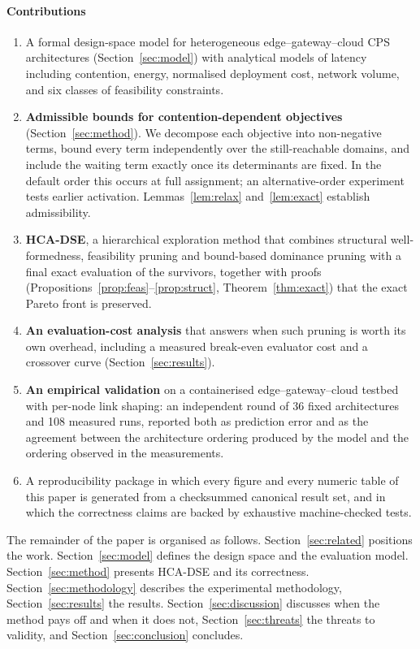 \documentclass[preprint,11pt,3p]{elsarticle}
\theoremstyle{plain}
\theoremstyle{definition}
\begin{document}
\paragraph{Contributions}
\begin{enumerate}
\item A formal design-space model for heterogeneous edge--gateway--cloud CPS
  architectures (Section~\ref{sec:model}) with analytical models of latency including
  contention, energy, normalised deployment cost, network volume, and six classes of
  feasibility constraints.
\item \textbf{Admissible bounds for contention-dependent objectives}
  (Section~\ref{sec:method}). We decompose each objective into non-negative terms,
  bound every term independently over the still-reachable domains, and include the waiting term exactly once its determinants are fixed.
  In the default order this occurs at full assignment; an alternative-order experiment tests earlier activation. Lemmas~\ref{lem:relax} and~\ref{lem:exact} establish
  admissibility.
\item \textbf{HCA-DSE}, a hierarchical exploration method that combines structural
  well-formedness, feasibility pruning and bound-based dominance pruning with a final
  exact evaluation of the survivors, together with proofs
  (Propositions~\ref{prop:feas}--\ref{prop:struct}, Theorem~\ref{thm:exact}) that the
  exact Pareto front is preserved.
\item \textbf{An evaluation-cost analysis} that answers when such pruning is worth its
  own overhead, including a measured break-even evaluator cost and a crossover curve
  (Section~\ref{sec:results}).
\item \textbf{An empirical validation} on a containerised edge--gateway--cloud testbed
  with per-node link shaping: an independent round of 36 fixed architectures and 108 measured runs, reported both as
  prediction error and as the agreement between the architecture ordering produced by
  the model and the ordering observed in the measurements.
\item A reproducibility package in which every figure and every numeric table of this
  paper is generated from a checksummed canonical result set, and in which the
  correctness claims are backed by exhaustive machine-checked tests.
\end{enumerate}

The remainder of the paper is organised as follows. Section~\ref{sec:related} positions
the work. Section~\ref{sec:model} defines the design space and the evaluation model.
Section~\ref{sec:method} presents HCA-DSE and its correctness.
Section~\ref{sec:methodology} describes the experimental methodology,
Section~\ref{sec:results} the results. Section~\ref{sec:discussion} discusses when the
method pays off and when it does not, Section~\ref{sec:threats} the threats to validity,
and Section~\ref{sec:conclusion} concludes.
\end{document}
